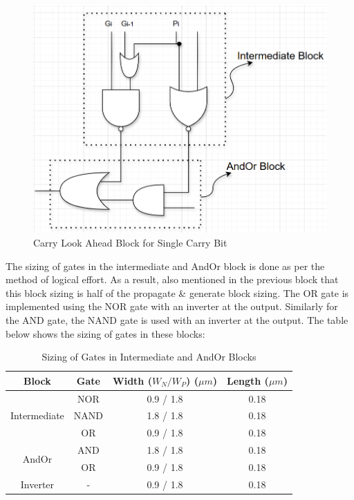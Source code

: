 \documentclass[conference]{IEEEtran}
\begin{document}
\begin{figure}[H]
    \centering
    \includegraphics[width=0.9\linewidth]{clacir.png}
    \caption{Carry Look Ahead Block for Single Carry Bit}
    \label{fig:cla_block}
\end{figure}

The sizing of gates in the intermediate and AndOr block is done as per the method of logical effort. As a result, also mentioned in the previous block that this block sizing is half of the propagate \& generate block sizing. The OR gate is implemented using the NOR gate with an inverter at the output. Similarly for the AND gate, the NAND gate is used with an inverter at the output. The table below shows the sizing of gates in these blocks:

\begin{table}[H]
\centering
\caption{Sizing of Gates in Intermediate and AndOr Blocks}
\begin{tabular}{|c|c|c|c|}
\hline
\rowcolor{cyan!10}
\textbf{Block} & \textbf{Gate} & \textbf{Width ($W_N / W_P$) ($\mu m$)} & \textbf{Length ($\mu m$)} \\ \hline
\multirow{3}{*}{Intermediate} & NOR  & 0.9 / 1.8   & 0.18  \\ \cline{2-4} 
                              & NAND & 1.8 / 1.8   & 0.18  \\ \cline{2-4} 
                              & OR   & 0.9 / 1.8   & 0.18  \\ \hline
\multirow{2}{*}{AndOr}        & AND  & 1.8 / 1.8   & 0.18  \\ \cline{2-4}
                              & OR   & 0.9 / 1.8   & 0.18  \\ \hline 
Inverter                      & -    & 0.9 / 1.8   & 0.18  \\ \hline   
\end{tabular}
\label{tab:cla_block}
\end{table}
\end{document}
